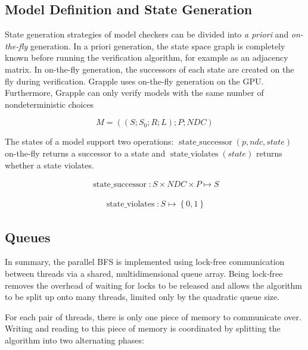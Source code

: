 \documentclass[
fancyheadings, %
%
%
]{stsreprt}
\DeclareMathOperator{\sSuccessor}{state\_successor}
\DeclareMathOperator{\sViolates}{state\_violates}
\begin{document}

\subsection{Model Definition and State Generation}
\label{section:theory:model-definition-state-generation}

State generation strategies of model checkers can be divided into \emph{a priori} and \emph{on-the-fly} generation.
In a priori generation, the state space graph is completely known before running the verification algorithm, for example as an adjacency matrix.
In on-the-fly generation, the successors of each state are created on the fly during verification.
Grapple uses on-the-fly generation on the GPU.
Furthermore, Grapple can only verify models with the same number of nondeterministic choices

\[M = \left(\left(S; S_0; R; L\right); P; \mathit{NDC}\right)\]

The states of a model support two operations: $\sSuccessor(p, ndc, state)$ on-the-fly returns a successor to a state and $\sViolates(state)$ returns whether a state violates.

\begin{align*}
    \sSuccessor
    : S \times \mathit{NDC} \times \mathit{P}
    \mapsto S
\end{align*}

\begin{align*}
    \sViolates
    : S
    \mapsto \left\{0, 1\right\}
\end{align*}

\subsection{Queues}
\label{section:theory:queues}

In summary, the parallel BFS is implemented using lock-free communication between threads via a shared, multidimensional queue array.
Being lock-free removes the overhead of waiting for locks to be released and allows the algorithm to be split up onto many threads, limited only by the quadratic queue size.

For each pair of threads, there is only one piece of memory to communicate over.
Writing and reading to this piece of memory is coordinated by splitting the algorithm into two alternating phases:
\end{document}
